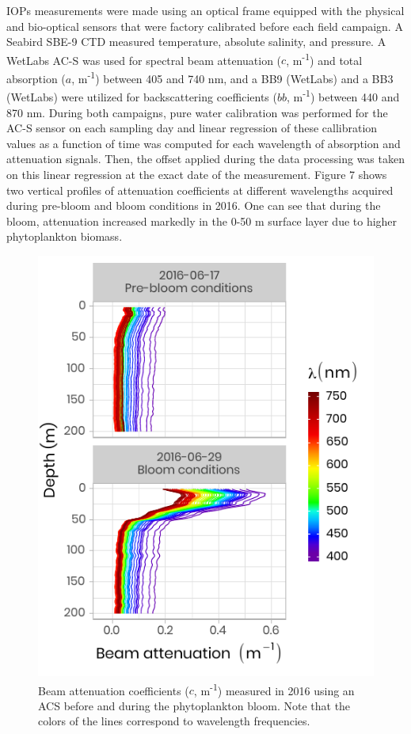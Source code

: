\documentclass[essd, manuscript]{copernicus}
\begin{document}
IOPs measurements were made using an optical frame equipped with the physical and bio-optical sensors that were factory calibrated before each field campaign. A Seabird SBE-9 CTD measured temperature, absolute salinity, and pressure. A WetLabs AC-S was used for spectral beam attenuation ($c$, m\textsuperscript{-1}) and total absorption ($a$, m\textsuperscript{-1}) between 405 and 740 nm, and a BB9 (WetLabs) and a BB3 (WetLabs) were utilized for backscattering coefficients ($bb$, m\textsuperscript{-1}) between 440 and 870 nm. During both campaigns, pure water calibration was performed for the AC-S sensor on each sampling day and linear regression of these callibration values as a function of time was computed for each wavelength of absorption and attenuation signals. Then, the offset applied during the data processing was taken on this linear regression at the exact date of the measurement. Figure 7 shows two vertical profiles of attenuation coefficients at different wavelengths acquired during pre-bloom and bloom conditions in 2016. One can see that during the bloom, attenuation increased markedly in the 0-50 m surface layer due to higher phytoplankton biomass.

\begin{figure}[H]
	\centering
	\includegraphics[scale = 1]{../../../../graphs/fig07.pdf}
	\caption{Beam attenuation coefficients ($c$, m\textsuperscript{-1}) measured in 2016 using an ACS before and during the phytoplankton bloom. Note that the colors of the lines correspond to wavelength frequencies.}
\end{figure}
\end{document}
